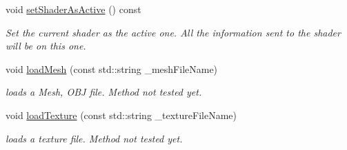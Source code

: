\begin{DoxyCompactItemize}
\item 
\hypertarget{class_object_loader_a1545820e46bc97530d34454b2bfe7b20}{void \hyperlink{class_object_loader_a1545820e46bc97530d34454b2bfe7b20}{set\-Shader\-As\-Active} () const }\label{class_object_loader_a1545820e46bc97530d34454b2bfe7b20}

\begin{DoxyCompactList}\small\item\em Set the current shader as the active one. All the information sent to the shader will be on this one. \end{DoxyCompactList}\item 
\hypertarget{class_object_loader_a0e17d739447bc8b758f7d0826ff0d82e}{void \hyperlink{class_object_loader_a0e17d739447bc8b758f7d0826ff0d82e}{load\-Mesh} (const std\-::string \-\_\-mesh\-File\-Name)}\label{class_object_loader_a0e17d739447bc8b758f7d0826ff0d82e}

\begin{DoxyCompactList}\small\item\em loads a Mesh, O\-B\-J file. Method not tested yet. \end{DoxyCompactList}\item 
\hypertarget{class_object_loader_ab1680ee5acad9c8a02ff7b87460c9d30}{void \hyperlink{class_object_loader_ab1680ee5acad9c8a02ff7b87460c9d30}{load\-Texture} (const std\-::string \-\_\-texture\-File\-Name)}\label{class_object_loader_ab1680ee5acad9c8a02ff7b87460c9d30}

\begin{DoxyCompactList}\small\item\em loads a texture file. Method not tested yet. \end{DoxyCompactList}\end{DoxyCompactItemize}
